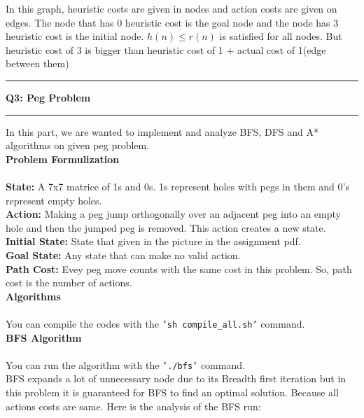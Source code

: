 \documentclass[11pt]{article}
\newcommand\question[2]{\vspace{.25in}\hrule\textbf{#1: #2}\vspace{.5em}\hrule\vspace{.10in}}
\renewcommand\part[1]{\vspace{.10in}\textbf{#1}}
\begin{document}
	In this graph, heuristic costs are given in nodes and action costs are given on edges. The node that has 0 heuristic cost is the goal node and the node has 3 heuristic cost is the initial node. $h(n) \leq r(n)$ is satisfied for all nodes. But heuristic cost of 3 is bigger than heuristic cost of 1 + actual cost of 1(edge between them)
	
	
	\question{Q3}{Peg Problem}
	In this part, we are wanted to implement and analyze BFS, DFS and A* algorithms on given peg problem.\\
	\part{Problem Formulization} \\ \ \\
	\textbf{State:} A 7x7 matrice of 1s and 0s. 1s represent holes with pegs in them and 0's represent empty holes.\\
	\textbf{Action:} Making a peg jump orthogonally over an adjacent peg into an empty hole and then the jumped peg is removed. This action creates a new state.\\
	\textbf{Initial State:} State that given in the picture in the assignment pdf.\\
	\textbf{Goal State:} Any state that can make no valid action.\\
	\textbf{Path Cost:} Evey peg move counts with the same cost in this problem. So, path cost is the number of actions.\\
	
	\part{Algorithms} \\ \ \\
	
	You can compile the codes with the \texttt{'sh compile\_all.sh'} command.\\
	
	\part{BFS Algorithm} \\ \ \\
	
	You can run the algorithm with the \texttt{'./bfs'} command.\\
	
	BFS expands a lot of unnecessary node due to its Breadth first iteration but in this problem it is guaranteed for BFS to find an optimal solution. Because all actions costs are same. Here is the analysis of the BFS run:
	
\end{document}
